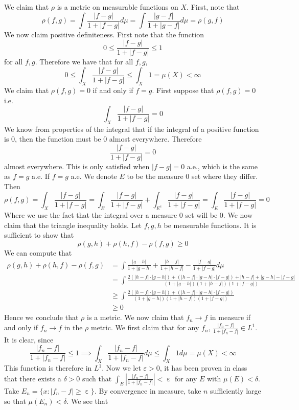 \documentclass[letterpaper]{article}
\DeclareMathOperator{\ep}{\varepsilon}
\begin{document}
\noindent
We claim that $\rho$ is a metric on measurable functions on $X$. First, note that $$\rho(f,g) = \int \frac{|f-g|}{1+|f-g|}d \mu = \int \frac{|g-f|}{1+|g-f|} d\mu = \rho(g,f)$$
We now claim positive definiteness. First note that the function $$0\leq \frac{|f-g|}{1+|f-g|} \leq 1$$ for all $f,g$. Therefore we have that for all $f,g$, $$0\leq \int_X \frac{|f-g|}{1+|f-g|} \leq \int_X 1 = \mu(X) < \infty$$ We claim that $\rho(f,g)=0 $ if and only if $f=g$. 
First suppose that $\rho(f,g)=0$ i.e. $$\int_{X} \frac{|f-g|}{1+|f-g|} =0$$ We know from properties of the integral that if the integral of a positive function is 0, then the function must be 0 almost everywhere. Therefore $$\frac{|f-g|}{1+|f-g|}=0$$ almost everywhere. This is only satisfied when $|f-g|=0$ a.e., which is the same as $f=g$ a.e. 
If $f=g$ a.e. We denote $E$ to be the measure 0 set where they differ. Then $$\rho(f,g) = \int_X \frac{|f-g|}{1+|f-g|} = \int_E \frac{|f-g|}{1+|f-g|} + \int_{E^c} \frac{|f-g|}{1+|f-g|} = \int_{E} \frac{|f-g|}{1+|f-g|} =0$$
Where we use the fact that the integral over a measure 0 set will be 0. 
We now claim that the triangle inequality holds. Let $f,g,h$ be measurable functions. It is sufficient to show that $$\rho(g,h) + \rho(h,f) - \rho(f,g)\geq 0$$
We can compute that 
\begin{align*}
    \rho(g,h) + \rho(h,f) - \rho(f,g) & = \int \frac{|g-h|}{1+|g-h|} + \frac{|h-f|}{1+|h-f|} - \frac{|f-g|}{1+|f-g|} d\mu
    \\ & = \int \frac{2(|h-f|\cdot |g-h|) +(|h-f|\cdot |g-h|\cdot|f-g|) + |h-f| +|g-h| - |f-g|}{(1+|g-h|)(1+|h-f|)(1+|f-g|)}
    \\ & \geq \int \frac{2(|h-f|\cdot |g-h|) +(|h-f|\cdot |g-h|\cdot|f-g|)}{(1+|g-h|)(1+|h-f|)(1+|f-g|)} \tag{by triangle inequality}
    \\ & \geq 0 \tag{since this function is positive}
\end{align*}
Hence we conclude that $\rho$ is a metric. We now claim that $f_n \to f$ in measure if and only if $f_n \to f$ in the $\rho$ metric. We first claim that for any $f_n$, $\frac{|f_n-f|}{1+|f_n-f|} \in L^1$. It is clear, since $$\frac{|f_n-f|}{1+|f_n-f|} \leq 1 \implies \int_X \frac{|f_n-f|}{1+|f_n-f|} d\mu \leq \int_X 1 d\mu = \mu(X)<\infty$$
This function is therefore in $L^1$. Now we let $\varepsilon >0$, it has been proven in class that there exists a $\delta>0$ such that $\int_E |\frac{|f_n-f|}{1+|f_n-f|}| < \ep$ for any $E$ with $\mu(E)< \delta$. Take $E_{n} = \{x: |f_n-f| \geq \ep \}$. By convergence in measure, take $n$ sufficiently large so that $\mu(E_{n})<\delta$. We see that 
\end{document}

